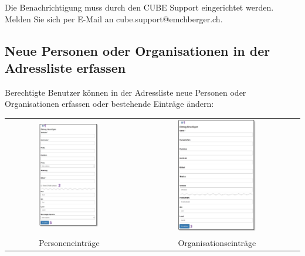 \vspace{\baselineskip}

Die Benachrichtigung muss durch den CUBE Support eingerichtet werden. Melden Sie sich per E-Mail an {\color{red} cube.support@emchberger.ch}.

\clearpage
\subsection{Neue Personen oder Organisationen in der Adressliste erfassen}
\label{bkm:Ref2018071901}
Berechtigte Benutzer können in der Adressliste neue Personen oder Organisationen erfassen oder bestehende Einträge ändern:

\vspace{\baselineskip}

\begin{tabular}{cc} %
\includegraphics[width=0.49\textwidth]{../chapters/03_Adressliste/pictures/3-2_Personeneintraege.jpg} & \includegraphics[width=0.49\textwidth]{../chapters/03_Adressliste/pictures/3-2_Firmeneintraege.jpg} \\
Personeneinträge & Organisationseinträge \\
\end{tabular}

